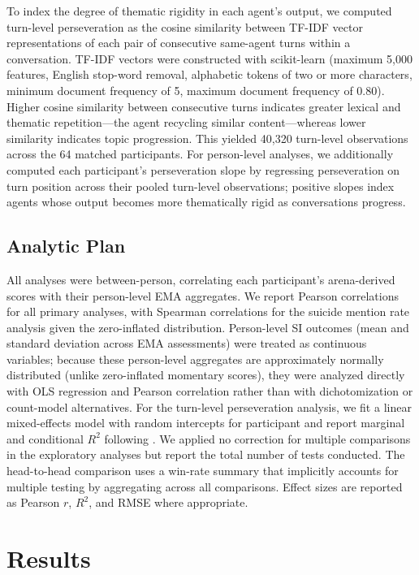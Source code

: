 \documentclass[review,12pt,authoryear]{elsarticle}
\begin{document}
To index the degree of thematic rigidity in each agent's output, we computed turn-level perseveration as the cosine similarity between TF-IDF vector representations of each pair of consecutive same-agent turns within a conversation. TF-IDF vectors were constructed with scikit-learn (maximum 5,000 features, English stop-word removal, alphabetic tokens of two or more characters, minimum document frequency of 5, maximum document frequency of 0.80). Higher cosine similarity between consecutive turns indicates greater lexical and thematic repetition---the agent recycling similar content---whereas lower similarity indicates topic progression. This yielded 40,320 turn-level observations across the 64 matched participants. For person-level analyses, we additionally computed each participant's perseveration slope by regressing perseveration on turn position across their pooled turn-level observations; positive slopes index agents whose output becomes more thematically rigid as conversations progress.

\subsection{Analytic Plan}

All analyses were between-person, correlating each participant's arena-derived scores with their person-level EMA aggregates. We report Pearson correlations for all primary analyses, with Spearman correlations for the suicide mention rate analysis given the zero-inflated distribution. Person-level SI outcomes (mean and standard deviation across EMA assessments) were treated as continuous variables; because these person-level aggregates are approximately normally distributed (unlike zero-inflated momentary scores), they were analyzed directly with OLS regression and Pearson correlation rather than with dichotomization or count-model alternatives. For the turn-level perseveration analysis, we fit a linear mixed-effects model with random intercepts for participant and report marginal and conditional $R^2$ following \citet{nakagawa2013general}. We applied no correction for multiple comparisons in the exploratory analyses but report the total number of tests conducted. The head-to-head comparison uses a win-rate summary that implicitly accounts for multiple testing by aggregating across all comparisons. Effect sizes are reported as Pearson $r$, $R^2$, and RMSE where appropriate.


\section{Results}
\end{document}
